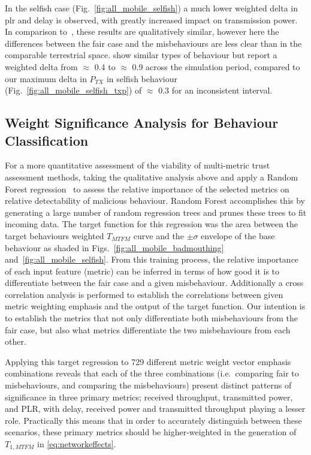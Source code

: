 In the selfish case (Fig.~\ref{fig:all_mobile_selfish}) a much lower weighted delta in \gls{plr} and delay is observed, with greatly increased impact on transmission power.
In comparison to~\cite{Guo11}, these results are qualitatively similar, however here the differences between the fair case and the misbehaviours are less clear than in the comparable terrestrial space.
\citet{Guo11} show similar types of behaviour but report a weighted delta from $\approx$ 0.4 to $\approx$ 0.9 across the simulation period, compared to our maximum delta in $P_{TX}$ in selfish behaviour (Fig.~\ref{fig:all_mobile_selfish_txp}) of $\approx$ 0.3 for an inconsistent interval.

\subsection{Weight Significance Analysis for Behaviour Classification}

For a more quantitative assessment of the viability of multi-metric trust assessment methods, taking the qualitative analysis above and apply a Random Forest regression~\cite{Breiman2001} to assess the relative importance of the selected metrics on relative detectability of malicious behaviour. 
Random Forest accomplishes this by generating a large number of random regression trees and prunes these trees to fit incoming data.
The target function for this regression was the area between the target behaviours weighted $T_{MTFM}$ curve and the $\pm\sigma$ envelope of the base behaviour as shaded in Figs.~\ref{fig:all_mobile_badmouthing} and~\ref{fig:all_mobile_selfish}.
From this training process, the relative importance of each input feature (metric) can be inferred in terms of how good it is to differentiate between the fair case and a given misbehaviour.
Additionally a cross correlation analysis is performed to establish the correlations between given metric weighting emphasis and the output of the target function.
Our intention is to establish the metrics that not only differentiate both misbehaviours from the fair case, but also what metrics differentiate the two misbehaviours from each other.

Applying this target regression to 729 different metric weight vector emphasis combinations reveals that each of the three combinations (i.e.\ comparing fair to misbehaviours, and comparing the misbehaviours) present distinct patterns of significance in three primary metrics; received throughput, transmitted power, and PLR, with delay, received power and transmitted throughput playing a lesser role.
Practically this means that in order to accurately distinguish between these scenarios, these primary metrics should be higher-weighted in the generation of $T_{1,MTFM}$ in \eqref{eq:networkeffects}.

